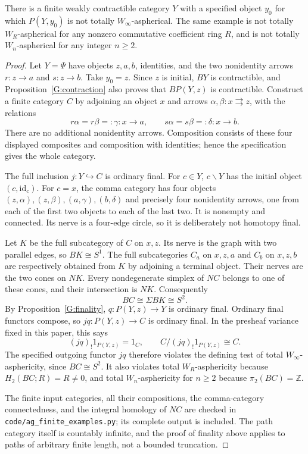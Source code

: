 \begin{theorem}\label{G:counterexample}
There is a finite weakly contractible category $Y$ with a specified object $y_0$ for which $P(Y,y_0)$ is not totally $W_\infty$-aspherical. The same example is not totally $W_R$-aspherical for any nonzero commutative coefficient ring $R$, and is not totally $W_n$-aspherical for any integer $n\geq2$.
\end{theorem}

\begin{proof}
Let $Y=\Psi$ have objects $z,a,b$, identities, and the two nonidentity arrows $r:z\to a$ and $s:z\to b$. Take $y_0=z$. Since $z$ is initial, $BY$ is contractible, and Proposition~\ref{G:contraction} also proves that $BP(Y,z)$ is contractible. Construct a finite category $C$ by adjoining an object $x$ and arrows $\alpha,\beta:x\rightrightarrows z$, with the relations
\[
 r\alpha=r\beta=:\gamma:x\longrightarrow a,
 \qquad s\alpha=s\beta=: \delta:x\longrightarrow b.
\]
There are no additional nonidentity arrows. Composition consists of these four displayed composites and composition with identities; hence the specification gives the whole category.

The full inclusion $j:Y\hookrightarrow C$ is ordinary final. For $c\in Y$, $c\backslash Y$ has the initial object $(c,\mathrm{id}_c)$. For $c=x$, the comma category has four objects $(z,\alpha),(z,\beta),(a,\gamma),(b,\delta)$ and precisely four nonidentity arrows, one from each of the first two objects to each of the last two. It is nonempty and connected. Its nerve is a four-edge circle, so it is deliberately not homotopy final.

Let $K$ be the full subcategory of $C$ on $x,z$. Its nerve is the graph with two parallel edges, so $BK\cong S^1$. The full subcategories $C_a$ on $x,z,a$ and $C_b$ on $x,z,b$ are respectively obtained from $K$ by adjoining a terminal object. Their nerves are the two cones on $NK$. Every nondegenerate simplex of $NC$ belongs to one of these cones, and their intersection is $NK$. Consequently
\[
 BC\cong\Sigma BK\cong S^2.
\]
By Proposition~\ref{G:finality}, $q:P(Y,z)\to Y$ is ordinary final. Ordinary final functors compose, so $jq:P(Y,z)\to C$ is ordinary final. In the presheaf variance fixed in this paper, this says
\[
 (jq)_!1_{P(Y,z)}=1_C,
 \qquad C/(jq)_!1_{P(Y,z)}\cong C.
\]
The specified outgoing functor $jq$ therefore violates the defining test of total $W_\infty$-asphericity, since $BC\cong S^2$. It also violates total $W_R$-asphericity because $H_2(BC;R)=R\ne0$, and total $W_n$-asphericity for $n\geq2$ because $\pi_2(BC)=\mathbb Z$.

The finite input categories, all their compositions, the comma-category connectedness, and the integral homology of $NC$ are checked in \texttt{code/ag\_finite\_examples.py}; its complete output is included. The path category itself is countably infinite, and the proof of finality above applies to paths of arbitrary finite length, not a bounded truncation.
\end{proof}

